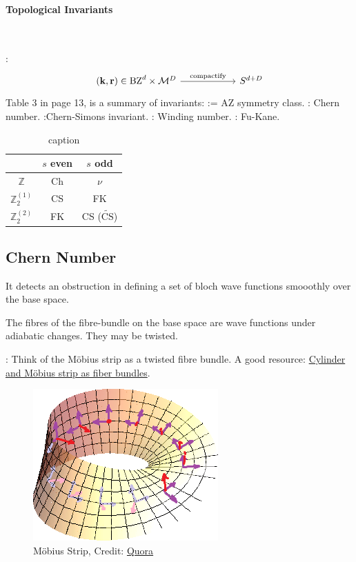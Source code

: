\documentclass{article}
\begin{document}
\paragraph{Topological Invariants} $ $

:
\begin{equation}
\begin{tikzcd}[]
    (\vb{k},\vb{r})\in \text{BZ}^d\times \mathcal{M}^D
    \ar[rr, "\text{compactify}"] &\, & S^{d+D}
\end{tikzcd}
\end{equation}
Table 3 in page 13, is a summary of invariants:
:= AZ symmetry class. : Chern number.
:Chern-Simons invariant. \nomen{$\nu$}: Winding number.
: Fu-Kane.
\begin{table}[H]
    \centering
    \caption{caption}
    \label{tab:label}
    \begin{tabu}{c c c}
        $\,$ & $s$ even & $s$ odd \\
        \hline
        $\mathbb{Z}$ & Ch & $\nu$ \\
        $\mathbb{Z}_2^{(1)}$ & CS & FK \\
        $\mathbb{Z}_2^{(2)}$ & FK & CS ($\widetilde{\text{CS}}$) \\
        \bottomrule
    \end{tabu}
\end{table}

\subsection{Chern Number}
\label{sec:Chern-Number}
It detects an obstruction in defining a set of bloch wave functions
smooothly over the base space.

 The fibres of the fibre-bundle on the base space are
wave functions under adiabatic changes. They may be twisted.

: Think of the M\"obius strip as a twisted fibre bundle.
A good resource:
\href{http://math.stackexchange.com/questions/1377855/cylinder-and-m%C3%B6bius-strip-as-fiber-bundles-trivializations-and-cocycles}{Cylinder
and Möbius strip as fiber bundles}. 
\begin{figure}[H]
    \centering
    \includegraphics[width=0.2\linewidth]{pics/mobius-fibre.png}
    \caption{M\"obius Strip, 
        Credit:
        \href{https://www.quora.com/What-is-a-Fiber-Bundle-in-laymans-terms-What-is-it-used-for}{Quora} }
\end{figure}
\end{document}
